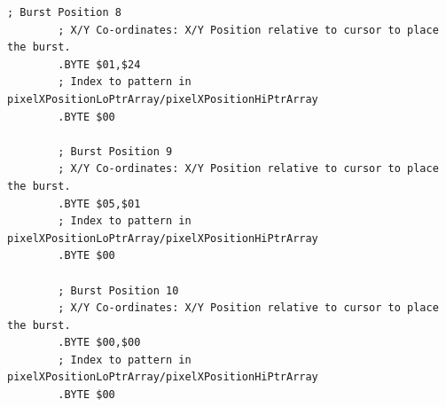 \begin{lstlisting}[basicstyle=\tiny,caption=Source code for the F3 Burst.]
        ; Burst Position 8
        ; X/Y Co-ordinates: X/Y Position relative to cursor to place the burst.
        .BYTE $01,$24
        ; Index to pattern in pixelXPositionLoPtrArray/pixelXPositionHiPtrArray
        .BYTE $00

        ; Burst Position 9
        ; X/Y Co-ordinates: X/Y Position relative to cursor to place the burst.
        .BYTE $05,$01
        ; Index to pattern in pixelXPositionLoPtrArray/pixelXPositionHiPtrArray
        .BYTE $00

        ; Burst Position 10
        ; X/Y Co-ordinates: X/Y Position relative to cursor to place the burst.
        .BYTE $00,$00
        ; Index to pattern in pixelXPositionLoPtrArray/pixelXPositionHiPtrArray
        .BYTE $00

\end{lstlisting}

